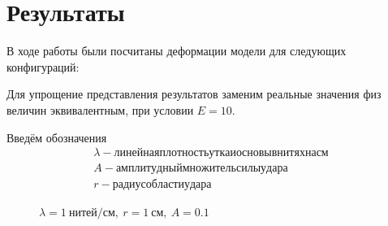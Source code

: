 \chapter{Результаты}\label{ch:results}
В ходе работы были посчитаны деформации модели для следующих конфигураций:

Для упрощение представления результатов заменим реальные значения физ величин эквивалентным, при условии $E=10$.

Введём обозначения
\begin{gather*}
    \lambda - линейная плотность утка и основы в нитях на см \\
    A - амплитудный множитель силы удара \\
    r - радиус области удара
\end{gather*}

\begin{figure}[H]
    \centering
    \caption{$\lambda=1~нитей/см,~r=1~см,~A=0.1$}


\end{figure}
